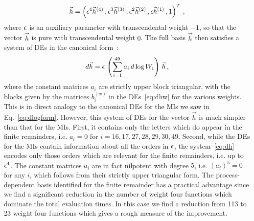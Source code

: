 \documentclass[main.tex]{subfiles}
\begin{document}
\begin{align}
\vec{h} = \left( \epsilon^4 \vec{h}^{(4)}\,, \epsilon^3 \vec{h}^{(3)}\,, \epsilon^2 \vec{h}^{(2)} \,, \epsilon \vec{h}^{(1)} \,, 1 \right)^T \,,
\end{align}
where $\epsilon$ is an auxiliary parameter with transcendental weight $-1$, so that the vector $\vec{h}$ is pure with transcendental weight $0$. The full basis $\vec{h}$ then satisfies a system of DEs in the canonical form~\cite{Henn:2013pwa}:
\begin{align} \label{eq:dh}
d \vec{h} = \epsilon \, \left(  \sum_{i=1}^{49} a_i \, d\log W_i \right) \, \vec{h} \,,
\end{align}
where the constant matrices $a_i$ are strictly upper block triangular, with the blocks given by the matrices $b_i^{(w)}$ in the DEs~\ref{eq:dhw} for the various weights. This is in direct analogy to the canonical DEs for the MIs we saw in Eq.~\ref{eq:dlogform}.
However, this system of DEs for the vector $\vec{h}$ is much simpler than that for the MIs. First, it contains only the letters which do appear in the finite remainders, i.e. $a_i = 0$ for $i=16,17,27,28,29,30,49$. Second, while the DEs for the MIs contain information about all the orders in $\epsilon$, the system~\ref{eq:dh} encodes only those orders which are relevant for the finite remainders, i.e. up to $\epsilon^4$. The constant matrices $a_i$ are in fact nilpotent with degree $5$, i.e. $(a_i)^5 = 0$ for any $i$, which follows from their strictly upper triangular form. The process-dependent basis identified for the finite remainder has a practical advantage since we find a significant reduction in the number of weight four functions which dominate the total evaluation times. In this case we find a reduction from 113 to 23 weight four functions which gives a rough measure of the improvement.
\end{document}
